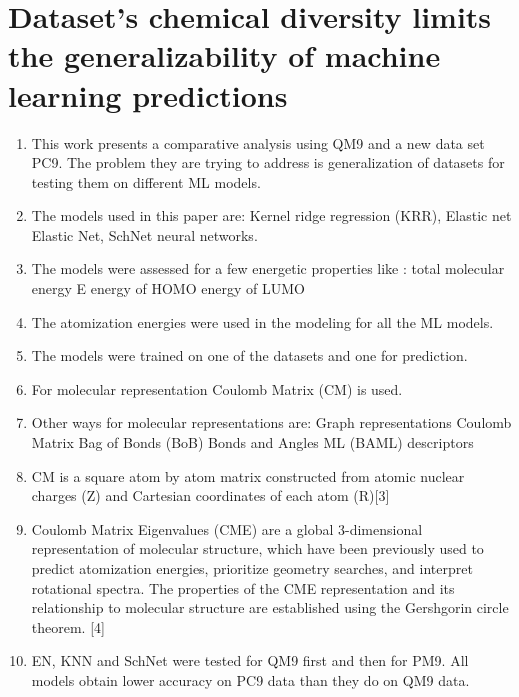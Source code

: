\documentclass[]{report}
\begin{document}
\section{Dataset’s chemical diversity limits
the generalizability of machine learning
predictions}
\begin{enumerate}
    \item This work presents a comparative analysis using QM9 and a new data set PC9. The problem they are trying to address is generalization of datasets for testing them on different ML models.
    \item The models used in this paper are: Kernel ridge regression (KRR), Elastic net Elastic Net, SchNet neural networks.
    \item The models were assessed for a few energetic properties like :
    \subitem total molecular energy E 
    \subitem energy of HOMO 
    \subitem energy of LUMO 
    \item The atomization energies were used in the modeling for all the ML models.
    \item The models were trained on one of the datasets and one for prediction.
    \item For molecular representation Coulomb Matrix (CM)  is used.
    \item Other ways for molecular representations are:
    \subitem Graph representations 
    \subitem  Coulomb Matrix 
    \subitem Bag of Bonds (BoB)
    \subitem Bonds and Angles ML (BAML) descriptors 
    \item CM is a square atom by atom matrix constructed from atomic nuclear charges (Z) and Cartesian coordinates of each atom (R)[3]
    \item Coulomb Matrix Eigenvalues (CME) are a global 3-dimensional representation of molecular structure,
which have been previously used to predict atomization energies, prioritize geometry searches, and
interpret rotational spectra. The properties of the CME representation and its relationship to molecular
structure are established using the Gershgorin circle theorem. [4]
\item EN, KNN and SchNet were tested for QM9 first and then for PM9.  All models obtain lower accuracy on PC9 data than they do on QM9 data.
\end{enumerate}

	
\end{document}
